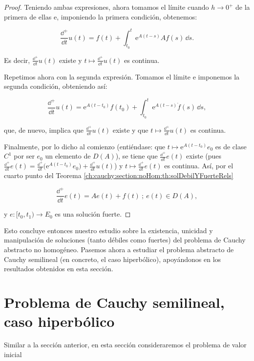 \begin{proof}
    Teniendo ambas expresiones, ahora tomamos el límite cuando $h \rightarrow 0^+$ de la primera de ellas e, imponiendo la primera condición, obtenemos:

    \[\frac{\dd^+}{\dd t}u(t) = f(t) + \int_{t_0}^t \mathrm{e}^{A(t-s)}Af(s) \, \dd s.\]

    Es decir, $\displaystyle \frac{\dd^+}{\dd t}u(t)$ existe y $\displaystyle t \mapsto \frac{\dd^+}{\dd t}u(t)$ es continua.

    Repetimos ahora con la segunda expresión. Tomamos el límite e imponemos la segunda condición, obteniendo así:

    \[\frac{\dd^+}{\dd t}u(t) = \mathrm{e}^{A(t-t_0)}f(t_0) + \int_{t_0}^t \mathrm{e}^{A(t-s)}\dot{f}(s) \, \dd s,\]

    que, de nuevo, implica que $\displaystyle \frac{\dd^+}{\dd t}u(t)$ existe y que $\displaystyle t \mapsto \frac{\dd^+}{\dd t}u(t)$ es continua.

    Finalmente, por lo dicho al comienzo (entiéndase: que $t \mapsto \mathrm{e}^{A(t-t_0)}e_0$ es de clase $C^1$ por ser $e_0$ un elemento de $D(A)$), se tiene que $\displaystyle \frac{\dd^+}{\dd t}e(t)$ existe (pues $\displaystyle \frac{\dd^+}{\dd t}e(t) = \frac{\dd^+}{\dd t}\Big(\mathrm{e}^{A(t - t_0)}e_0 \Big) + \frac{\dd^+}{\dd t}u(t)$) y $\displaystyle t \mapsto \frac{\dd^+}{\dd t}e(t)$ es continua. Así, por el cuarto punto del Teorema \ref{ch:cauchy:section:noHom:th:solDebilYFuerteRels}

    \[\frac{\dd^+}{\dd t}e(t) = Ae(t) + f(t) \ ; \ e(t) \in D(A), \]

    y $e: [t_0, t_1) \rightarrow E_0$ es una solución fuerte.
\end{proof}

Esto concluye entonces nuestro estudio sobre la existencia, unicidad y manipulación de soluciones (tanto débiles como fuertes) del problema de Cauchy abstracto no homogéneo. Pasemos ahora a estudiar el problema abstracto de Cauchy semilineal (en concreto, el caso hiperbólico), apoyándonos en los resultados obtenidos en esta sección.

\section{Problema de Cauchy semilineal, caso hiperbólico}
\label{ch:cauchy:section:semilineal}

Similar a la sección anterior, en esta sección consideraremos el problema de valor inicial

